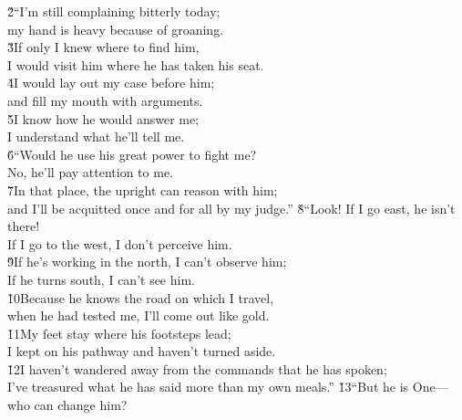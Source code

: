 \begin{poetry}
\poeml \v{2}``I'm still complaining bitterly today; \\
\poemll    my hand is heavy because of groaning. \\
\poeml \v{3}If only I knew where to find him, \\
\poemll    I would visit him where he has taken his seat. \\
\poeml \v{4}I would lay out my case before him; \\
\poemll    and fill my mouth with arguments. \\
\poeml \v{5}I know how he would answer me; \\
\poemll    I understand what he'll tell me. \\
\poeml \v{6}``Would he use his great power to fight me? \\
\poemll    No, he'll pay attention to me. \\
\poeml \v{7}In that place, the upright can reason with him; \\
\poemll    and I'll be acquitted once and for all by my judge.''
\poeml \v{8}``Look! If I go east, he isn't there! \\
\poemll    If I go to the west, I don't perceive him. \\
\poeml \v{9}If he's working in the north, I can't observe him; \\
\poemll    If he turns south, I can't see him. \\
\poeml \v{10}Because he knows the road on which I travel, \\
\poemll    when he had tested me, I'll come out like gold. \\
\poeml \v{11}My feet stay where his footsteps lead; \\
\poemll    I kept on his pathway and haven't turned aside. \\
\poeml \v{12}I haven't wandered away from the commands that he has spoken; \\
\poemll    I've treasured what he has said more than my own meals.''
\poeml \v{13}``But he is One---who can change him? \\

\end{poetry}

